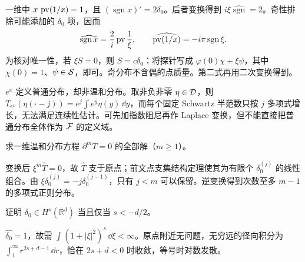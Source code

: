 \begin{example}[主值与跳跃]
一维中 $x\,\operatorname{pv}(1/x)=1$，且 $(\operatorname{sgn}x)'=2\delta_0$。后者变换得到 $i\xi\widehat{\operatorname{sgn}}=2$。奇性排除可能添加的 $\delta_0$ 项，因而
\[
 \widehat{\operatorname{sgn}x}=\frac2i\operatorname{pv}\frac1\xi,
 \qquad \widehat{\operatorname{pv}(1/x)}=-i\pi\operatorname{sgn}\xi.
\]
为核对唯一性，若 $\xi S=0$，则 $S=c\delta_0$：将探针写成 $\varphi(0)\chi+\xi\psi$，其中 $\chi(0)=1$、$\psi\in\mathcal{S}$，即可。奇分布不含偶的点质量。第二式再用二次变换得到。
\end{example}

\begin{example}[并非所有分布都可作此变换]
$e^x$ 定义普通分布，却非温和分布。取非负非零 $\eta\in\mathcal{D}$，则 $T_{e^x}(\eta(\cdot-j))=e^j\int e^y\eta(y)\,\dd y$，而每个固定 Schwartz 半范数只按 $j$ 多项式增长，无法满足连续性估计。可先加指数阻尼再作 Laplace 变换，但不能直接把普通分布全体作为 $\mathcal{F}$ 的定义域。
\end{example}

\begin{exercise}[多项式解的判定]\label{ex:y6-polynomial}
求一维温和分布方程 $\partial^mT=0$ 的全部解（$m\ge1$）。
\end{exercise}
\begin{solution}
变换后 $\xi^m\widehat T=0$，故 $\widehat T$ 支于原点；前文点支集结构定理使其为有限个 $\delta_0^{(j)}$ 的线性组合。由 $\xi\delta_0^{(j)}=-j\delta_0^{(j-1)}$，只有 $j<m$ 可以保留。逆变换得到次数至多 $m-1$ 的多项式正则分布。
\end{solution}

\begin{exercise}\label{ex:y6-dirac-sobolev}
证明 $\delta_0\in H^s(\mathbb R^d)$ 当且仅当 $s<-d/2$。
\end{exercise}
\begin{solution}
$\widehat{\delta_0}=1$，故需 $\int(1+|\xi|^2)^s\,\dd\xi<\infty$。原点附近无问题，无穷远的径向积分为 $\int_1^\infty r^{2s+d-1}\,\dd r$，恰在 $2s+d<0$ 时收敛，等号时对数发散。
\end{solution}
